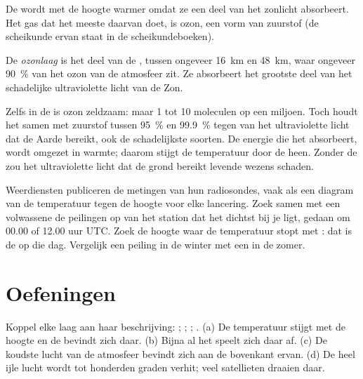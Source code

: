 De  wordt met de hoogte warmer omdat ze een deel van het
zonlicht absorbeert. Het gas dat het meeste daarvan doet, is ozon, een vorm
van zuurstof (de scheikunde ervan staat in de scheikundeboeken).

\begin{definition}[Ozonlaag]\label{def:g8:the-atmosphere:ozone-layer}
De \emph{ozonlaag} is het deel van de , tussen
ongeveer \qty{16}{km} en \qty{48}{km}, waar ongeveer 90~\% van het ozon van
de atmosfeer zit. Ze absorbeert het grootste deel van het schadelijke
ultraviolette licht van de Zon.
\end{definition}

Zelfs in de  is ozon zeldzaam: maar 1 tot 10 moleculen op een
miljoen. Toch houdt het samen met zuurstof tussen 95~\% en 99.9~\% tegen
van het ultraviolette licht dat de Aarde bereikt, ook de schadelijkste
soorten. De energie die het absorbeert, wordt omgezet in warmte; daarom
stijgt de temperatuur door de  heen. Zonder de  zou het
ultraviolette licht dat de grond bereikt levende wezens schaden.

\begin{inthefield}
Weerdiensten publiceren de metingen van hun radiosondes, vaak als een
diagram van de temperatuur tegen de hoogte voor elke lancering. Zoek samen
met een volwassene de peilingen op van het station dat het dichtst bij je
ligt, gedaan om 00.00 of 12.00 uur UTC. Zoek de hoogte waar de temperatuur
stopt met : dat is de  op die dag. Vergelijk een peiling in
de winter met een in de zomer.
\end{inthefield}

\section{Oefeningen}

\begin{exercise}[$\star$]\label{exo:g8:the-atmosphere:1}
Koppel elke laag aan haar beschrijving: ; ;
; . (a) De temperatuur stijgt met de hoogte en de
 bevindt zich daar. (b) Bijna al het  speelt zich daar af.
(c) De koudste lucht van de atmosfeer bevindt zich aan de bovenkant ervan.
(d) De heel ijle lucht wordt tot honderden graden verhit; veel satellieten
draaien daar.
\end{exercise}

